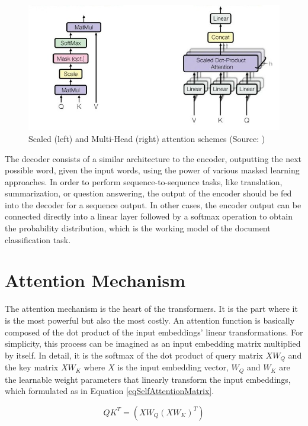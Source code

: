 \documentclass{iyte}
\begin{document}
\begin{figure}[ht]
\centering
\includegraphics[width=15cm]{images/attention_details.jpg}
\caption{Scaled (left) and Multi-Head (right) attention schemes (Source: \cite{attention_is_all_you_need})}
\label{fig:attention_details}
\end{figure}

The decoder consists of a similar architecture to the encoder, outputting the next possible word, given the input words, using the power of various masked learning approaches. In order to perform sequence-to-sequence tasks, like translation, summarization, or question answering, the output of the encoder should be fed into the decoder for a sequence output. In other cases, the encoder output can be connected directly into a linear layer followed by a softmax operation to obtain the probability distribution, which is the working model of the document classification task.

\section{Attention Mechanism}

The attention mechanism is the heart of the transformers. It is the part where it is the most powerful but also the most costly. An attention function is basically composed of the dot product of the input embeddings' linear transformations. For simplicity, this process can be imagined as an input embedding matrix multiplied by itself. In detail, it is the softmax of the dot product of query matrix $XW_{Q}$ and the key matrix $XW_{K}$ where $X$ is the input embedding vector, $W_{Q}$ and $W_{K}$ are the learnable weight parameters that linearly transform the input embeddings, which formulated as in Equation \ref{eqSelfAttentionMatrix}.

\begin{equation}
\label{eqSelfAttentionMatrix}
QK^{T}=(XW_{Q}(XW_{K})^T)
\end{equation}
\end{document}
